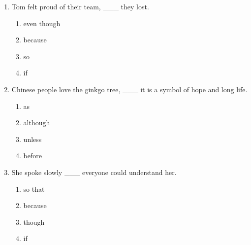 \documentclass[11pt,a4paper]{ctexart}
\begin{document}
\begin{enumerate}[leftmargin=*,itemsep=4pt]
\begin{enumerate}[label=\Alph*.,leftmargin=2em,itemsep=1pt,topsep=2pt]
\item Because
\item If
\item When
\end{enumerate}
\item Tom felt proud of their team, \_\_\_ they lost.
\begin{enumerate}[label=\Alph*.,leftmargin=2em,itemsep=1pt,topsep=2pt]
\item even though
\item because
\item so
\item if
\end{enumerate}
\item Chinese people love the ginkgo tree, \_\_\_ it is a symbol of hope and long life.
\begin{enumerate}[label=\Alph*.,leftmargin=2em,itemsep=1pt,topsep=2pt]
\item as
\item although
\item unless
\item before
\end{enumerate}
\item She spoke slowly \_\_\_ everyone could understand her.
\begin{enumerate}[label=\Alph*.,leftmargin=2em,itemsep=1pt,topsep=2pt]
\item so that
\item because
\item though
\item if
\end{enumerate}
\end{enumerate}
\end{document}
